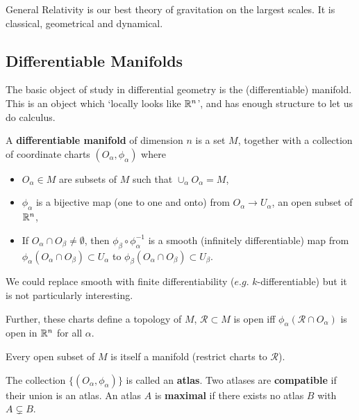 

General Relativity is our best theory of gravitation on the largest scales. It is classical, geometrical and dynamical.

\subsection{Differentiable Manifolds}

The basic object of study in differential geometry is the (differentiable) manifold. This is an object which `locally looks like $\mathbb{R}^{n}$', and has enough structure to let us do calculus.

\begin{definition}
    A \textbf{differentiable manifold} of dimension $n$ is a set $M$, together with a collection of coordinate charts $\left( O_\alpha, \phi_\alpha \right) $ where
    \begin{itemize}
        \item $O_{\alpha} \in M$ are subsets of $M$ such that $\cup_{\alpha} O_\alpha = M$,
        \item $\phi_\alpha$ is a bijective map (one to one and onto) from $O_{\alpha} \to U_{\alpha}$, an open subset of $\mathbb{R}^{n}$,
        \item If $O_{\alpha} \cap O_{\beta} \neq \emptyset$, then $\phi_{\beta} \circ \phi_{\alpha}^{-1}$ is a smooth (infinitely differentiable) map from $\phi_{\alpha}\left( O_{\alpha} \cap O_{\beta} \right) \subset U_{\alpha}$ to $\phi_{\beta} \left( O_{\alpha} \cap O_{\beta} \right) \subset U_{\beta}$.
    \end{itemize}
\end{definition}

\begin{note}
    We could replace smooth with finite differentiability ($e.g.$ $k$-differentiable) but it is not particularly interesting.

    Further, these charts define a topology of $M$, $\mathcal{R} \subset M$ is open iff $\phi_{\alpha} \left( \mathcal{R} \cap O_{\alpha} \right) $ is open in $\mathbb{R}^{n}$ for all $\alpha$. 

    Every open subset of $M$ is itself a manifold (restrict charts to $\mathcal{R}$).
\end{note}

\begin{definition}
    The collection $\{\left( O_\alpha, \phi_\alpha \right) \} $ is called an \textbf{atlas}. Two atlases are \textbf{compatible} if their union is an atlas. An atlas $A$ is \textbf{maximal} if there exists no atlas $B$ with $A \subsetneq B$. 
\end{definition}

